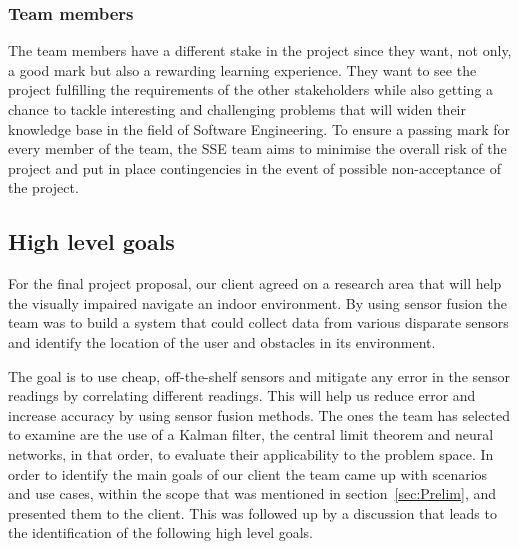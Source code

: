 \documentclass[prodmode,acmtosem]{acmsmall} %
\begin{document}
\subsubsection{Team members}
The team members have a different stake in the project since they want, not only, a good mark but also a rewarding learning experience.
They want to see the project fulfilling the requirements of the other stakeholders while also getting a chance to tackle interesting and challenging problems that will widen their knowledge base in the field of Software Engineering.
To ensure a passing mark for every member of the team, the SSE team aims to minimise the overall risk of the project and put in place contingencies in the event of possible non-acceptance of the project.

\subsection{High level goals}

For the final project proposal, our client agreed on a research area that will help the visually impaired navigate an indoor environment.
By using sensor fusion the team was to build a system that could collect data from various disparate sensors and identify the location of the user and obstacles in its environment.

The goal is to use cheap, off-the-shelf sensors and mitigate any error in the sensor readings by correlating different readings. This will help us reduce error and increase accuracy by using sensor fusion methods. The ones the team has selected to examine are the use of a Kalman filter, the central limit theorem and neural networks, in that order, to evaluate their applicability to the problem space. In order to identify the main goals of our client the team came up with scenarios and use cases, within the scope that was mentioned in section~\ref{sec:Prelim}, and presented them to the client. This was followed up by a discussion that leads to the identification of the following high level goals.
\end{document}
